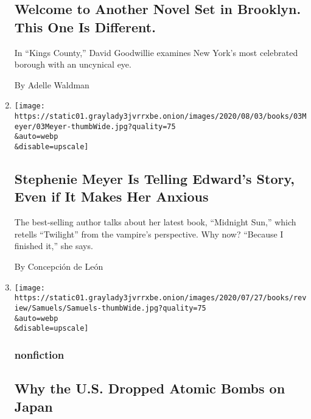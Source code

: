 \begin{enumerate}
  \hypertarget{welcome-to-another-novel-set-in-brooklyn-this-one-is-different}{%
  \subsection{Welcome to Another Novel Set in Brooklyn. This One Is
  Different.}\label{welcome-to-another-novel-set-in-brooklyn-this-one-is-different}}

  In ``Kings County,'' David Goodwillie examines New York's most
  celebrated borough with an uncynical eye.

  By Adelle Waldman
\item
  \href{/2020/08/03/books/midnight-sun-stephenie-meyer-twilight.html}{}

  \texttt{[image: https://static01.graylady3jvrrxbe.onion/images/2020/08/03/books/03Meyer/03Meyer-thumbWide.jpg?quality=75\\\&auto=webp\\\&disable=upscale]}

  \hypertarget{stephenie-meyer-is-telling-edwards-story-even-if-it-makes-her-anxious}{%
  \subsection{Stephenie Meyer Is Telling Edward's Story, Even if It
  Makes Her
  Anxious}\label{stephenie-meyer-is-telling-edwards-story-even-if-it-makes-her-anxious}}

  The best-selling author talks about her latest book, ``Midnight Sun,''
  which retells ``Twilight'' from the vampire's perspective. Why now?
  ``Because I finished it,'' she says.

  By Concepción de León
\item
  \href{/2020/08/03/books/review/unconditional-marc-gallicchio.html}{}

  \texttt{[image: https://static01.graylady3jvrrxbe.onion/images/2020/07/27/books/review/Samuels/Samuels-thumbWide.jpg?quality=75\\\&auto=webp\\\&disable=upscale]}

  \hypertarget{nonfiction}{%
  \subsubsection{nonfiction}\label{nonfiction}}

  \hypertarget{why-the-us-dropped-atomic-bombs-on-japan}{%
  \subsection{Why the U.S. Dropped Atomic Bombs on
  Japan}\label{why-the-us-dropped-atomic-bombs-on-japan}}


\end{enumerate}
